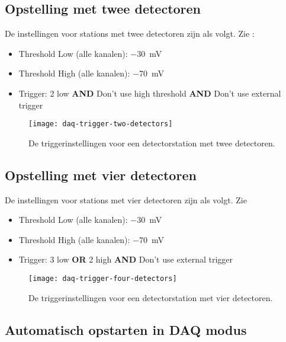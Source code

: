 \subsection{Opstelling met twee detectoren}

De instellingen voor stations met twee detectoren zijn als volgt. Zie
:

\begin{itemize}
    \item Threshold Low (alle kanalen): \SI{-30}{\milli\volt}
    \item Threshold High (alle kanalen): \SI{-70}{\milli\volt}
    \item Trigger: 2 low \textbf{AND} Don’t use high threshold \textbf{AND}
          Don’t use external trigger
\end{itemize}

\begin{figure}
    \centering
    \texttt{[image: daq-trigger-two-detectors]}
    \caption{De triggerinstellingen voor een detectorstation met twee detectoren.}
    \label{fig:daq-trigger-two-detectors}
\end{figure}


\subsection{Opstelling met vier detectoren}

De instellingen voor stations met vier detectoren zijn als volgt. Zie

\begin{itemize}
    \item Threshold Low (alle kanalen): \SI{-30}{\milli\volt}
    \item Threshold High (alle kanalen): \SI{-70}{\milli\volt}
    \item Trigger: 3 low \textbf{OR} 2 high \textbf{AND} Don’t use external trigger
\end{itemize}

\begin{figure}
    \centering
    \texttt{[image: daq-trigger-four-detectors]}
    \caption{De triggerinstellingen voor een detectorstation met vier detectoren.}
    \label{fig:daq-trigger-four-detectors}
\end{figure}


\subsection{Automatisch opstarten in DAQ modus}

